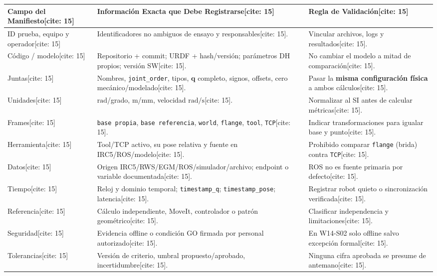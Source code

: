 \documentclass[10pt, a4paper]{article}
\begin{document}
\vspace{0.15cm}
\noindent
{\scriptsize
\renewcommand{\arraystretch}{1.28}
\noindent\begin{tabularx}{\textwidth}{|>{\hsize=0.65\hsize\raggedright\arraybackslash}X|>{\hsize=1.25\hsize\raggedright\arraybackslash}X|>{\hsize=1.10\hsize\raggedright\arraybackslash}X|}
\hline
\rowcolor{gray!20}
\textbf{Campo del Manifiesto}[cite: 15] & \textbf{Información Exacta que Debe Registrarse}[cite: 15] & \textbf{Regla de Validación}[cite: 15] \\ \hline
ID prueba, equipo y operador[cite: 15] & Identificadores no ambiguos de ensayo y responsables[cite: 15]. & Vincular archivos, logs y resultados[cite: 15]. \\ \hline
Código / modelo[cite: 15] & Repositorio + commit; URDF + hash/versión; parámetros DH propios; versión SW[cite: 15]. & No cambiar el modelo a mitad de comparación[cite: 15]. \\ \hline
Juntas[cite: 15] & Nombres, \texttt{joint\_order}, tipos, $\mathbf{q}$ completo, signos, offsets, cero mecánico/modelado[cite: 15]. & Pasar la \textbf{misma configuración física} a ambos cálculos[cite: 15]. \\ \hline
Unidades[cite: 15] & $\mathrm{rad}$/grado, $\mathrm{m}$/$\mathrm{mm}$, velocidad $\mathrm{rad/s}$[cite: 15]. & Normalizar al SI antes de calcular métricas[cite: 15]. \\ \hline
Frames[cite: 15] & \texttt{base propia}, \texttt{base referencia}, \texttt{world}, \texttt{flange}, \texttt{tool}, \texttt{TCP}[cite: 15]. & Indicar transformaciones para igualar base y punto[cite: 15]. \\ \hline
Herramienta[cite: 15] & Tool/TCP activo, su pose relativa y fuente en IRC5/ROS/modelo[cite: 15]. & Prohibido comparar \texttt{flange} (brida) contra \texttt{TCP}[cite: 15]. \\ \hline
Datos[cite: 15] & Origen IRC5/RWS/EGM/ROS/simulador/archivo; endpoint o variable documentada[cite: 15]. & ROS no es fuente primaria por defecto[cite: 15]. \\ \hline
Tiempo[cite: 15] & Reloj y dominio temporal; \texttt{timestamp\_q}; \texttt{timestamp\_pose}; latencia[cite: 15]. & Registrar robot quieto o sincronización verificada[cite: 15]. \\ \hline
Referencia[cite: 15] & Cálculo independiente, MoveIt, controlador o patrón geométrico[cite: 15]. & Clasificar independencia y limitaciones[cite: 15]. \\ \hline
Seguridad[cite: 15] & Evidencia offline o condición GO firmada por personal autorizado[cite: 15]. & En W14-S02 solo offline salvo excepción formal[cite: 15]. \\ \hline
Tolerancias[cite: 15] & Versión de criterio, umbral propuesto/aprobado, incertidumbre[cite: 15]. & Ninguna cifra aprobada se presume de antemano[cite: 15]. \\ \hline
\end{tabularx}
}
\end{document}
